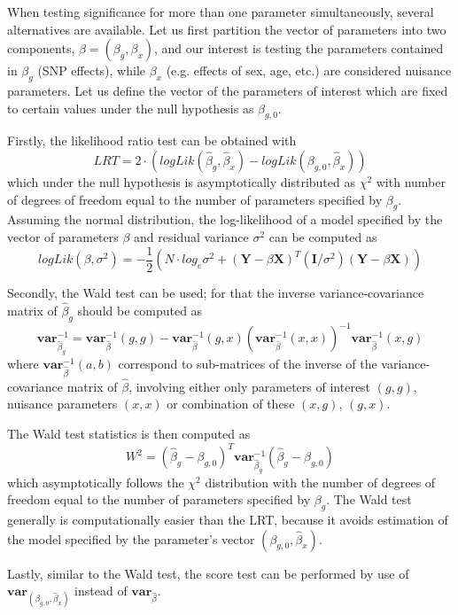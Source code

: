 \documentclass[12pt,a4paper]{article}
\begin{document}
When testing significance for more than one parameter simultaneously, 
several alternatives are available. Let us first partition the vector of 
parameters into two components, $\beta = (\beta_g,\beta_x)$, and our 
interest is testing the parameters contained in $\beta_g$ (SNP effects), 
while $\beta_x$ (e.g. effects of sex, age, etc.) are considered nuisance 
parameters. Let us define the vector of the parameters of interest 
which are fixed to certain values under the null hypothesis as $\beta_{g,0}$. 

Firstly, the likelihood ratio test can be obtained with
$$
LRT = 2 \cdot (logLik(\hat{\beta}_g,\hat{\beta}_x) - logLik(\beta_{g,0},\hat{\beta}_x))
$$
which under the null hypothesis is asymptotically distributed as $\chi^2$ with 
number of degrees of freedom equal to the number of parameters specified 
by $\beta_g$. Assuming the normal distribution, the log-likelihood of a 
model specified by the vector of parameters $\beta$ and residual variance 
$\sigma^2$ can be computed as
$$
logLik(\beta,\sigma^2) = 
-\frac{1}{2} ( N \cdot log_e \sigma^2 +
(\mathbf{Y} - \beta \mathbf{X})^T (\mathbf{I}/\sigma^2) (\mathbf{Y} - \beta \mathbf{X}) )
$$

Secondly, the Wald test can be used; for that the inverse variance-covariance
matrix of $\hat{\beta}_g$ should be computed as 
$$
\mathbf{var}_{\hat{\beta}_g}^{-1} = \mathbf{var}_{\hat{\beta}}^{-1}(g,g) - 
\mathbf{var}_{\hat{\beta}}^{-1}(g,x) (\mathbf{var}_{\hat{\beta}}^{-1}(x,x))^{-1} \mathbf{var}_{\hat{\beta}}^{-1}(x,g)
$$
where $\mathbf{var}_{\hat{\beta}}^{-1}(a,b)$ correspond to sub-matrices of the inverse of the 
variance-covariance matrix of $\hat{\beta}$, involving either only parameters of interest 
$(g,g)$, nuisance parameters $(x,x)$ or combination of these $(x,g)$, $(g,x)$.

The Wald test statistics is then computed as 
$$
W^2 = (\hat{\beta}_g - \beta_{g,0})^T \mathbf{var}_{\hat{\beta}_g}^{-1} (\hat{\beta}_g - \beta_{g,0})
$$
which asymptotically follows the $\chi^2$ distribution with the number of degrees 
of freedom equal to the number of parameters specified by $\beta_g$. The Wald test generally 
is computationally easier than the LRT, because it avoids estimation of the model 
specified by the parameter's vector $(\beta_{g,0},\hat{\beta}_x)$.

Lastly, similar to the Wald test, the score test can be performed by use 
of $\mathbf{var}_{(\beta_{g,0},\hat{\beta}_x)}$ instead of $\mathbf{var}_{\hat{\beta}}$.

\end{document}
